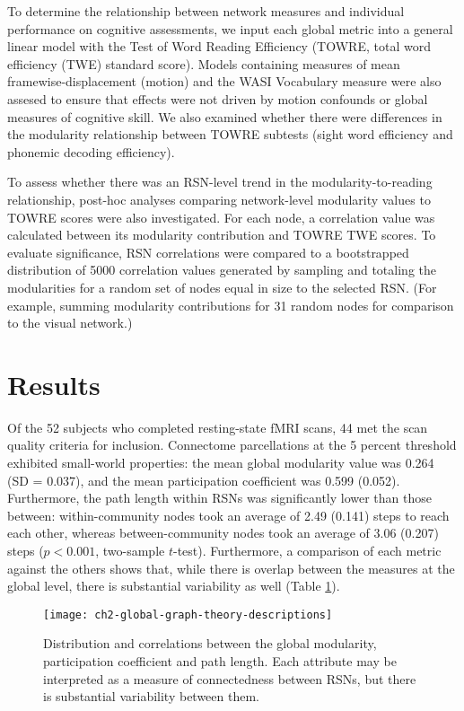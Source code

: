 To determine the relationship between network measures and individual performance on cognitive assessments, we input each global metric into a general linear model with the Test of Word Reading Efficiency (TOWRE, total word efficiency (TWE) standard score). Models containing measures of mean framewise-displacement (motion) and the WASI Vocabulary measure were also assesed to ensure that effects were not driven by motion confounds or global measures of cognitive skill. We also examined whether there were differences in the modularity relationship between TOWRE subtests (sight word efficiency  and phonemic decoding efficiency). 

To assess whether there was an RSN-level trend in the modularity-to-reading relationship, post-hoc analyses comparing network-level modularity values to TOWRE scores were also investigated. For each node, a correlation value was calculated between its modularity contribution and TOWRE TWE scores. To evaluate significance, RSN correlations were compared to a bootstrapped distribution of 5000 correlation values generated by sampling and totaling the modularities for a random set of nodes equal in size to the selected RSN. (For example, summing modularity contributions for 31 random nodes for comparison to the visual network.)


\section{Results} 

Of the 52 subjects who completed resting-state fMRI scans, 44 met the scan quality criteria for inclusion. Connectome parcellations at the 5 percent threshold exhibited small-world properties: the mean global modularity value was 0.264 (SD = 0.037), and the mean participation coefficient was 0.599 (0.052). Furthermore, the path length within RSNs was significantly lower than those between: within-community nodes took an average of 2.49 (0.141) steps to reach each other, whereas between-community nodes took an average of 3.06 (0.207) steps ($p < 0.001$, two-sample $t$-test). Furthermore, a comparison of each metric against the others shows that, while there is overlap between the measures at the global level, there is substantial variability as well (Table \ref{fig:ch2-global-graph-theory-descriptions}).

\begin{figure}[t!]
    \centering
    \texttt{[image: ch2-global-graph-theory-descriptions]}
    \caption[Distribution and correlations between global graph theory measures]{Distribution and correlations between the global modularity, participation coefficient and path length. Each attribute may be interpreted as a measure of connectedness between RSNs, but there is substantial variability between them.}
    \label{fig:ch2-global-graph-theory-descriptions}
\end{figure}

